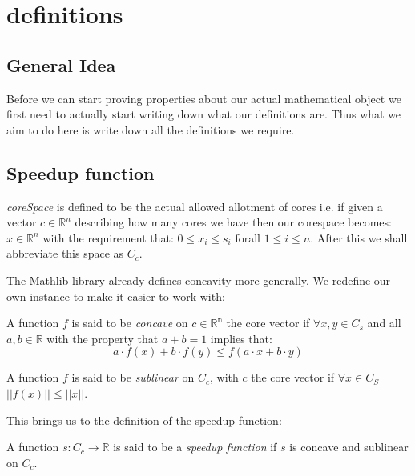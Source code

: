 \chapter{definitions}\label{ch_definitions}

\section{General Idea}
Before we can start proving properties about our actual mathematical object we first need to actually
start writing down what our definitions are. Thus what we aim to do here is write down all the definitions
we require.

\section{Speedup function}

\begin{definition}\label{def:corespace}\leanok
   \textit{coreSpace} is defined to be the actual allowed allotment of cores i.e. if given a vector
   $c \in \mathbb{R}^n$ describing how many cores we have then our corespace becomes:
   $x \in \mathbb{R}^n$ with the requirement that: $0 \leq x_i \leq s_i$ forall $1 \leq i \leq n$.
   After this we shall abbreviate this space as $C_c$.
\end{definition}

The Mathlib library already defines concavity more generally. We redefine our own instance to make
it easier to work with:
\begin{definition}\label{def:myConcave}\leanok
  A function $f$ is said to be \textit{concave} on $c \in \mathbb{R^n}$ the core vector if $\forall x, y \in C_s$
  and all $a, b \in \mathbb{R}$ with the property that $a + b = 1$ implies that:
  $$a \cdot f(x) + b \cdot f(y) \leq f(a \cdot x + b \cdot y)$$
\end{definition}

\begin{definition}\label{def:Sublinear}\leanok
  A function $f$ is said to be \textit{sublinear} on $C_c$, with $c$ the core vector if $\forall x \in C_S$
  $||f(x)|| \leq ||x||$.
\end{definition}

This brings us to the definition of the speedup function:
\begin{definition}\label{def:SpeedUpFunction}\leanok
  A function $s \colon C_c \to \mathbb{R}$ is said to be a \textit{speedup function} if $s$ is concave
  and sublinear on $C_c$.
\end{definition}

